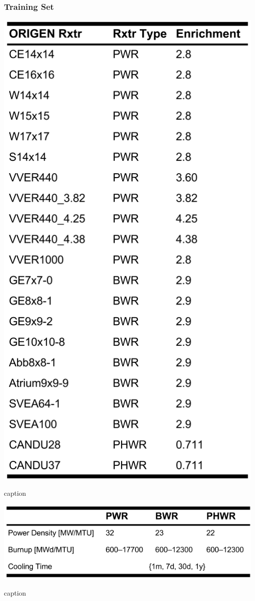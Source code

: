 
\begin{frame}
  \frametitle{Training Set}
  \begin{table}
    \centering
    \includegraphics[height=0.9\textheight]{./figures/TrainData.png}
    \caption{caption}
  \end{table}
  \begin{table}
    \centering
    \includegraphics[height=0.9\textheight]{./figures/TrainData2.png}
    \caption{caption}
  \end{table}
\end{frame}

